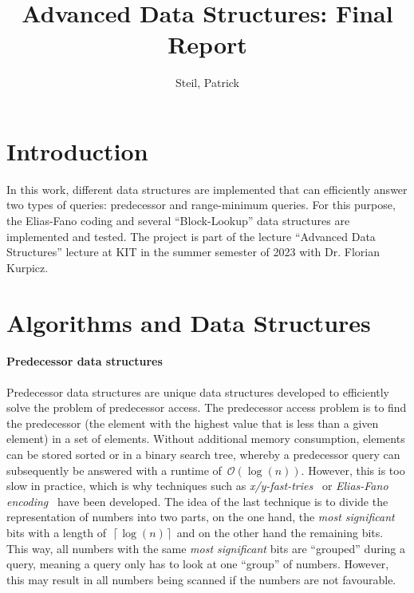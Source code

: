 \documentclass[a4paper,UKenglish,cleveref, autoref, thm-restate]{lipics-v2021}
\title{Advanced Data Structures: Final Report}
\author{Steil, Patrick}{2513240}{patrick.steil@student.kit.edu}{}{}
\begin{document}
	
	\maketitle
	
	\section{Introduction}
	\label{sec:introduction}
	
	In this work, different data structures are implemented that can efficiently answer two types of queries: predecessor and range-minimum queries. For this purpose, the Elias-Fano coding and several “Block-Lookup” data structures are implemented and tested. The project is part of the lecture “Advanced Data Structures” lecture at KIT in the summer semester of 2023 with Dr. Florian Kurpicz.
	\section{Algorithms and Data Structures}
	\label{sec:algorithms}
	\paragraph*{Predecessor data structures}
	Predecessor data structures are unique data structures developed to efficiently solve the problem of predecessor access. The predecessor access problem is to find the predecessor (the element with the highest value that is less than a given element) in a set of elements.
	Without additional memory consumption, elements can be stored sorted or in a binary search tree, whereby a predecessor query can subsequently be answered with a runtime of~$\mathcal{O}\left(\log(n)\right)$. However, this is too slow in practice, which is why techniques such as \textit{x/y-fast-tries}~\cite{WILLARD198381} or \textit{Elias-Fano encoding}~\cite{10.1145/321812.321820} have been developed. The idea of the last technique is to divide the representation of numbers into two parts, on the one hand, the \textit{most significant} bits with a length of~$\left\lceil\log\left(n\right)\right\rceil$ and on the other hand the remaining bits. This way, all numbers with the same \textit{most significant} bits are ``grouped'' during a query, meaning a query only has to look at one ``group'' of numbers. However, this may result in all numbers being scanned if the numbers are not favourable.	
\end{document}
